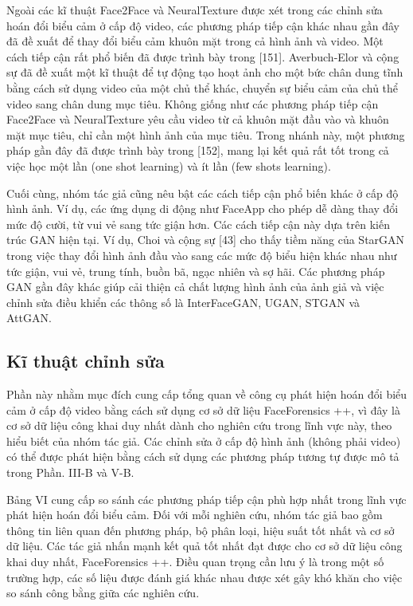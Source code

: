 \documentclass{article}
\begin{document}
Ngoài các kĩ thuật Face2Face và NeuralTexture được xét trong các chỉnh sửa hoán đổi biểu cảm ở cấp độ video, các phương pháp tiếp cận khác nhau gần đây đã đề xuất để thay đổi biểu cảm khuôn mặt trong cả hình ảnh và video. Một cách tiếp cận rất phổ biến đã được trình bày trong [151]. Averbuch-Elor và cộng sự đã đề xuất một kĩ thuật để tự động tạo hoạt ảnh cho một bức chân dung tĩnh bằng cách sử dụng video của một chủ thể khác, chuyển sự biểu cảm của chủ thể video sang chân dung mục tiêu. Không giống như các phương pháp tiếp cận Face2Face và NeuralTexture yêu cầu video từ cả khuôn mặt đầu vào và khuôn mặt mục tiêu, chỉ cần một hình ảnh của mục tiêu. Trong nhánh này, một phương pháp gần đây đã được trình bày trong [152], mang lại kết quả rất tốt trong cả việc học một lần (one shot learning) và ít lần (few shots learning).

Cuối cùng, nhóm tác giả cũng nêu bật các cách tiếp cận phổ biến khác ở cấp độ hình ảnh. Ví dụ, các ứng dụng di động như FaceApp cho phép dễ dàng thay đổi mức độ cười, từ vui vẻ sang tức giận hơn. Các cách tiếp cận này dựa trên kiến trúc GAN hiện tại. Ví dụ, Choi và cộng sự [43] cho thấy tiềm năng của StarGAN trong việc thay đổi hình ảnh đầu vào sang các mức độ biểu hiện khác nhau như tức giận, vui vẻ, trung tính, buồn bã, ngạc nhiên và sợ hãi. Các phương pháp GAN gần đây khác giúp cải thiện cả chất lượng hình ảnh của ảnh giả và việc chỉnh sửa điều khiển các thông số là InterFaceGAN, UGAN, STGAN và AttGAN.

\subsection{Kĩ thuật chỉnh sửa}


Phần này nhằm mục đích cung cấp tổng quan về công cụ phát hiện hoán đổi biểu cảm ở cấp độ video bằng cách sử dụng cơ sở dữ liệu FaceForensics ++, vì đây là cơ sở dữ liệu công khai duy nhất dành cho nghiên cứu trong lĩnh vực này, theo hiểu biết của nhóm tác giả. Các chỉnh sửa ở cấp độ hình ảnh (không phải video) có thể được phát hiện bằng cách sử dụng các phương pháp tương tự được mô tả trong Phần. III-B và V-B.

Bảng VI cung cấp so sánh các phương pháp tiếp cận phù hợp nhất trong lĩnh vực phát hiện hoán đổi biểu cảm. Đối với mỗi nghiên cứu, nhóm tác giả bao gồm thông tin liên quan đến phương pháp, bộ phân loại, hiệu suất tốt nhất và cơ sở dữ liệu. Các tác giả nhấn mạnh kết quả tốt nhất đạt được cho cơ sở dữ liệu công khai duy nhất, FaceForensics ++. Điều quan trọng cần lưu ý là trong một số trường hợp, các số liệu được đánh giá khác nhau được xét gây khó khăn cho việc so sánh công bằng giữa các nghiên cứu.
\end{document}
